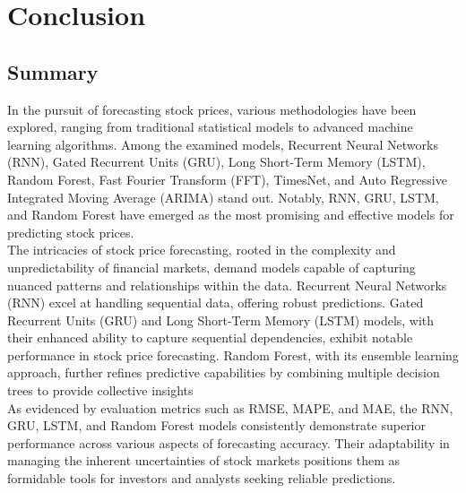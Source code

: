 \documentclass{ieeeojies}
\begin{document}
\section{Conclusion}
\subsection{Summary}
In the pursuit of forecasting stock prices, various methodologies have been explored, ranging from traditional statistical models to advanced machine learning algorithms. Among the examined models, Recurrent Neural Networks (RNN), Gated Recurrent Units (GRU), Long Short-Term Memory (LSTM), Random Forest, Fast Fourier Transform (FFT), TimesNet, and Auto Regressive Integrated Moving Average (ARIMA) stand out. Notably, RNN, GRU, LSTM, and Random Forest have emerged as the most promising and effective models for predicting stock prices.\\
The intricacies of stock price forecasting, rooted in the complexity and unpredictability of financial markets, demand models capable of capturing nuanced patterns and relationships within the data. Recurrent Neural Networks (RNN) excel at handling sequential data, offering robust predictions. Gated Recurrent Units (GRU) and Long Short-Term Memory (LSTM) models, with their enhanced ability to capture sequential dependencies, exhibit notable performance in stock price forecasting. Random Forest, with its ensemble learning approach, further refines predictive capabilities by combining multiple decision trees to provide collective insights\\
As evidenced by evaluation metrics such as RMSE, MAPE, and MAE, the RNN, GRU, LSTM, and Random Forest models consistently demonstrate superior performance across various aspects of forecasting accuracy. Their adaptability in managing the inherent uncertainties of stock markets positions them as formidable tools for investors and analysts seeking reliable predictions.\\
\end{document}
